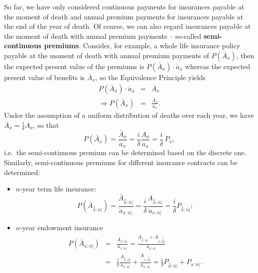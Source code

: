 \documentclass[11pt,fleqn,oneside]{book}
\begin{document}
So far, we have only considered continuous payments for insurances payable at the moment of death and annual premium payments for insurances payable at the end of the year of death. Of course, we can also regard insurances payable at the moment of death with annual premium payments -- so-called \textbf{semi-continuous premiums}. Consider, for example, a whole life insurance policy payable at the moment of death with annual premium payments of $P\left(\bar{A}_x\right)$, then the expected present value of the premiums is $P\left(\bar{A}_x\right) \cdot \ddot{a}_x$ whereas the expected present value of benefits is $\bar{A}_x$, so the Equivalence Principle yields
\begin{eqnarray*}
P\left(\bar{A}_x\right) \cdot \ddot{a}_x &=& \bar{A}_x \\
\Rightarrow P\left(\bar{A}_x\right) &=& \frac{\bar{A}_x}{\ddot{a}_x}.
\end{eqnarray*}
Under the assumption of a uniform distribution of deaths over each year, we have $\bar{A}_x = \frac{i}{\delta} A_x$, so that
$$
P\left(\bar{A}_x\right) = \frac{\bar{A}_x}{\ddot{a}_x} = \frac{i}{\delta} \frac{A_x}{\ddot{a}_x} = \frac{i}{\delta}\,P_x,
$$
i.e.\ the semi-continuous premium can be determined based on the discrete one. Similarly, semi-continuous premiums for different insurance contracts can be determined:
\begin{itemize}
\item $n$-year term life insurance:
$$
P\left(\bar{A}_{\stackrel{1}{x}:\overline{n}|}\right) = \frac{\bar{A}_{\stackrel{1}{x}:\overline{n}|}}{\ddot{a}_{x:\overline{n}|}} = \frac{i}{\delta}\frac{A_{\stackrel{1}{x}:\overline{n}|}}{\ddot{a}_{x:\overline{n}|}} = \frac{i}{\delta} P_{\stackrel{1}{x}:\overline{n}|};
$$ 
\item $n$-year endowment insurance
\begin{eqnarray*}
P\left(\bar{A}_{x:\overline{n}|}\right) &=& \frac{\bar{A}_{x:\overline{n}|}}{\ddot{a}_{x:\overline{n}|}} = \frac{\bar{A}_{\stackrel{1}{x}:\overline{n}|} + \bar{A}_{x:\stackrel{1}{\overline{n}|}}}{\ddot{a}_{x:\overline{n}|}}\\
& =& \frac{i}{\delta} \frac{A_{\stackrel{1}{x}:\overline{n}|}}{\ddot{a}_{x:\overline{n}|}} + 
\frac{A_{x:\stackrel{1}{\overline{n}|}}}{\ddot{a}_{x:\overline{n}|}} = \frac{i}{\delta} P_{\stackrel{1}{x}:\overline{n}|} + P_{x:\overline{n}|}.
\end{eqnarray*}
\end{itemize}
 
\end{document}
